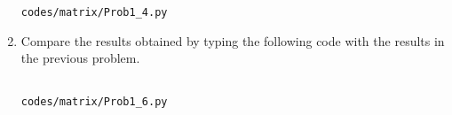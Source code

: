 \begin{enumerate}[label=\arabic*.,ref=\thesubsection.\theenumi]
\begin{lstlisting}
codes/matrix/Prob1_4.py
\end{lstlisting}
%
%
%
%
%
%
%
%	


%
%
%
%
%
%
%
%
%
%
%
%
%
%
%
%
%
%
%
%
\item
	Compare the results obtained by typing the following code with the results in the previous problem.
\begin{lstlisting}
 
codes/matrix/Prob1_6.py
\end{lstlisting}



\end{enumerate}

